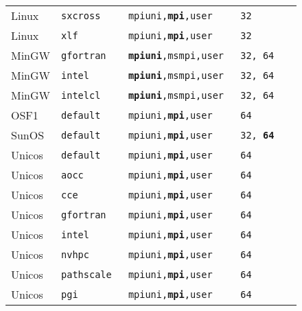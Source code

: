 \begin{longtable}{lllll}
Linux   &\tt sxcross     &\footnotesize \tt mpiuni,{\bf mpi},user      &\tt 32  \\
Linux   &\tt xlf         &\footnotesize \tt mpiuni,{\bf mpi},user      &\tt 32  \\
MinGW   &\tt gfortran    &\footnotesize \tt {\bf mpiuni},msmpi,user    &\tt 32, 64 \\
MinGW   &\tt intel       &\footnotesize \tt {\bf mpiuni},msmpi,user    &\tt 32, 64 \\
MinGW   &\tt intelcl     &\footnotesize \tt {\bf mpiuni},msmpi,user    &\tt 32, 64 \\
OSF1    &\tt default     &\footnotesize \tt mpiuni,{\bf mpi},user      &\tt 64  \\
SunOS   &\tt default     &\footnotesize \tt mpiuni,{\bf mpi},user      &\tt 32, {\bf 64} \\
Unicos  &\tt default     &\footnotesize \tt mpiuni,{\bf mpi},user      &\tt 64  \\
Unicos  &\tt aocc        &\footnotesize \tt mpiuni,{\bf mpi},user      &\tt 64  \\
Unicos  &\tt cce         &\footnotesize \tt mpiuni,{\bf mpi},user      &\tt 64  \\
Unicos  &\tt gfortran    &\footnotesize \tt mpiuni,{\bf mpi},user      &\tt 64  \\
Unicos  &\tt intel       &\footnotesize \tt mpiuni,{\bf mpi},user      &\tt 64  \\
Unicos  &\tt nvhpc       &\footnotesize \tt mpiuni,{\bf mpi},user      &\tt 64  \\
Unicos  &\tt pathscale   &\footnotesize \tt mpiuni,{\bf mpi},user      &\tt 64  \\
Unicos  &\tt pgi         &\footnotesize \tt mpiuni,{\bf mpi},user      &\tt 64

\end{longtable}

\vspace{1ex}

